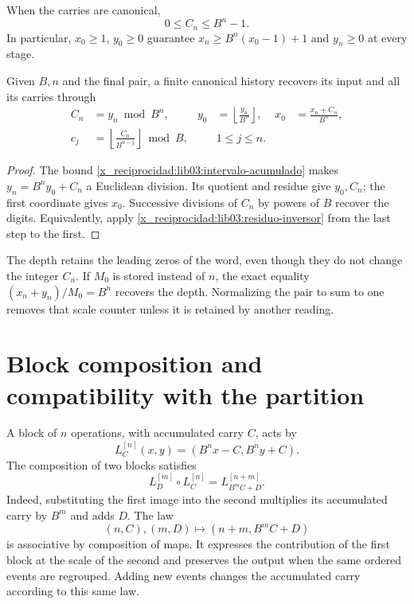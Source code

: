 When the carries are canonical,
\begin{equation}
 0\leq C_n\leq B^n-1.
 \label{x_reciprocidad:lib03:intervalo-acumulado}
\end{equation}
In particular, \(x_0\geq1\), \(y_0\geq0\) guarantee
\(x_n\geq B^n(x_0-1)+1\) and \(y_n\geq0\) at every stage.

\begin{corollary}
\label{x_reciprocidad:lib03:cor-palabra}
Given \(B,n\) and the final pair, a finite canonical history
recovers its input and all its carries through
\begin{align}
 C_n&=y_n\bmod B^n,&
 y_0&=\left\lfloor\frac{y_n}{B^n}\right\rfloor,&
 x_0&=\frac{x_n+C_n}{B^n},
 \label{x_reciprocidad:lib03:recuperacion-inicial}\\
 c_j&=\left\lfloor\frac{C_n}{B^{n-j}}\right\rfloor\bmod B,
 &&1\leq j\leq n.
 \label{x_reciprocidad:lib03:recuperacion-digitos}
\end{align}
\end{corollary}

\begin{proof}
The bound \eqref{x_reciprocidad:lib03:intervalo-acumulado} makes
\(y_n=B^ny_0+C_n\) a Euclidean division. Its quotient and residue
give \(y_0,C_n\); the first coordinate gives \(x_0\).
Successive divisions of \(C_n\) by powers of \(B\) recover
the digits. Equivalently, apply
\eqref{x_reciprocidad:lib03:residuo-inversor} from the last step to the first.
\end{proof}

The depth retains the leading zeros of the word, even though they
do not change the integer \(C_n\). If \(M_0\) is stored instead of
\(n\), the exact equality \((x_n+y_n)/M_0=B^n\) recovers the
depth. Normalizing the pair to sum to one removes that scale counter
unless it is retained by another reading.

\section{Block composition and compatibility with the partition}
\label{x_reciprocidad:lib03:composicion}

A block of \(n\) operations, with accumulated carry \(C\), acts by
\begin{equation}
 L_C^{[n]}(x,y)=(B^nx-C,B^ny+C).
 \label{x_reciprocidad:lib03:bloque}
\end{equation}
The composition of two blocks satisfies
\begin{equation}
 L_D^{[m]}\circ L_C^{[n]}=L_{B^mC+D}^{[n+m]}.
 \label{x_reciprocidad:lib03:ley-bloques}
\end{equation}
Indeed, substituting the first image into the second multiplies its
accumulated carry by \(B^m\) and adds \(D\). The law
\[
 (n,C),(m,D)\longmapsto(n+m,B^mC+D)
\]
is associative by composition of maps. It expresses the contribution
of the first block at the scale of the second and preserves the output when
the same ordered events are regrouped. Adding new events changes
the accumulated carry according to this same law.


